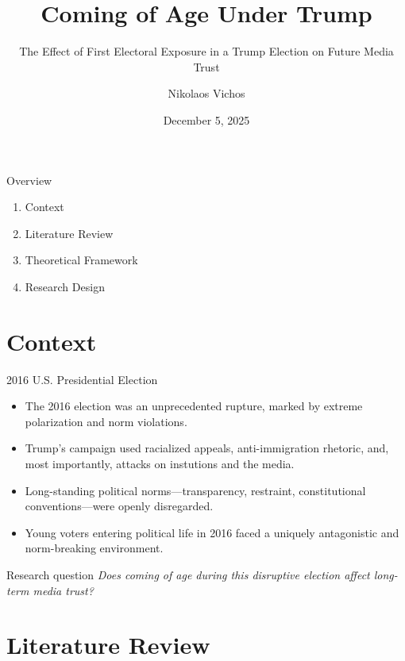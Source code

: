 \documentclass[
  ignorenonframetext,
]{beamer}
\title{Coming of Age Under Trump}
\subtitle{The Effect of First Electoral Exposure in a Trump Election on
Future Media Trust}
\author{Nikolaos Vichos}
\date{December 5, 2025}
\providecommand{\tightlist}{%
  \setlength{\itemsep}{0pt}\setlength{\parskip}{0pt}}
\begin{document}
\frame{\titlepage}


\begin{frame}{Overview}
\label{overview}
\begin{enumerate}
\tightlist
\item
  Context
\item
  Literature Review
\item
  Theoretical Framework
\item
  Research Design
\end{enumerate}
\end{frame}

\section{Context}\label{context}

\begin{frame}{2016 U.S. Presidential Election}
\label{u.s.-presidential-election}
\begin{itemize}
\item
  The 2016 election was an unprecedented rupture, marked by extreme
  polarization and norm violations.
\item
  Trump's campaign used racialized appeals, anti-immigration rhetoric,
  and, most importantly, attacks on instutions and the media.
\item
  Long-standing political norms---transparency, restraint,
  constitutional conventions---were openly disregarded.
\item
  Young voters entering political life in 2016 faced a uniquely
  antagonistic and norm-breaking environment.
\end{itemize}

\begin{block}{Research question}
\label{research-question}
\emph{Does coming of age during this disruptive election affect
long-term media trust?}
\end{block}
\end{frame}

\section{Literature Review}\label{literature-review}
\end{document}
